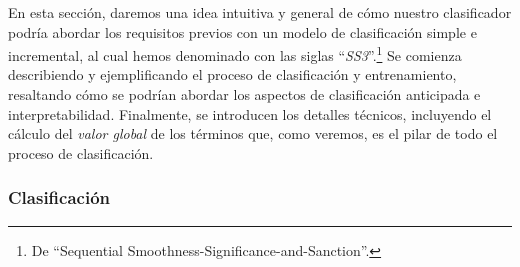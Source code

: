 En esta sección, daremos una idea intuitiva y general de cómo nuestro clasificador podría abordar los requisitos previos con un modelo de clasificación simple e incremental, al cual hemos denominado con las siglas ``\emph{SS3}''.\footnote{ De ``Sequential Smoothness-Significance-and-Sanction''.}
Se comienza describiendo y ejemplificando el proceso de clasificación y entrenamiento, resaltando cómo se podrían abordar los aspectos de clasificación anticipada e interpretabilidad. Finalmente, se introducen los detalles técnicos, incluyendo el cálculo del \emph{valor global} de los términos que, como veremos, es el pilar de todo el proceso de clasificación.


\subsubsection{Clasificación}
\label{sec:classification_process}


